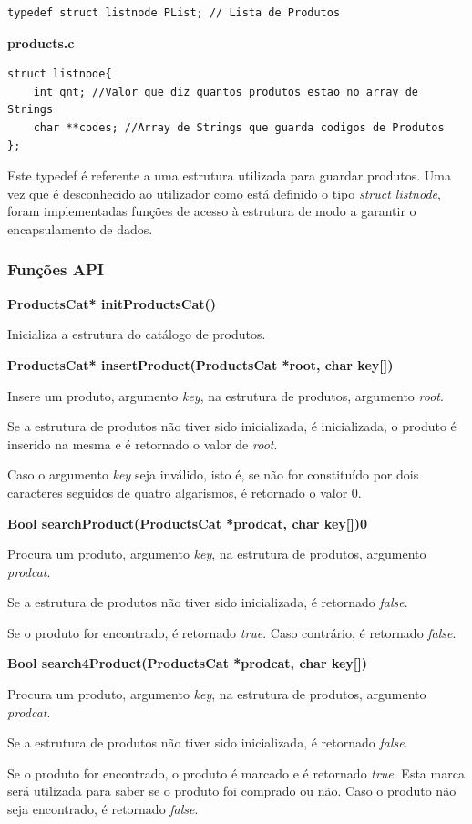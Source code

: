 \documentclass[10pt] {article}
\begin{document}
\begin{lstlisting}
typedef struct listnode PList; // Lista de Produtos
\end{lstlisting}
\textbf{products.c}
\begin{lstlisting}
struct listnode{
	int qnt; //Valor que diz quantos produtos estao no array de Strings
	char **codes; //Array de Strings que guarda codigos de Produtos
};
\end{lstlisting}

\par Este typedef é referente a uma estrutura utilizada para guardar produtos. Uma vez que é desconhecido ao
utilizador como está definido o tipo \emph{struct listnode}, foram implementadas funções de acesso à estrutura
de modo a garantir o encapsulamento de dados.

\subsubsection{Funções API}

\noindent \textbf{ProductsCat* initProductsCat()}
\par Inicializa a estrutura do catálogo de produtos.

\noindent \textbf{ProductsCat* insertProduct(ProductsCat *root, char key[])}
\par Insere um produto, argumento \emph{key}, na estrutura de produtos, argumento \emph{root}.
\par Se a estrutura de produtos não tiver sido inicializada, é inicializada, o produto é inserido na mesma e é retornado o valor de \emph{root}.
\par Caso o argumento \emph{key} seja inválido, isto é, se não for constituído por dois caracteres seguidos de quatro algarismos, é retornado o valor 0.

\noindent \textbf{Bool searchProduct(ProductsCat *prodcat, char key[])0}
\par Procura um produto, argumento \emph{key}, na estrutura de produtos, argumento \emph{prodcat}.
\par Se a estrutura de produtos não tiver sido inicializada, é retornado \emph{false}.
\par Se o produto for encontrado, é retornado \emph{true}. Caso contrário, é retornado \emph{false}.

\noindent \textbf{Bool search4Product(ProductsCat *prodcat, char key[])}
\par Procura um produto, argumento \emph{key}, na estrutura de produtos, argumento \emph{prodcat}.
\par Se a estrutura de produtos não tiver sido inicializada, é retornado \emph{false}.
\par Se o produto for encontrado, o produto é marcado e é retornado \emph{true}. Esta marca será utilizada para saber se o produto foi comprado ou não. Caso o produto não seja encontrado, é retornado \emph{false}.
\end{document}
